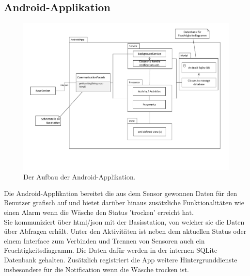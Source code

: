 \subsection{Android-Applikation}
\begin{figure}[htb] 
	\centerline{\includegraphics[scale=.4]{Architektur/App_v2.pdf} }
	\caption{Der Aufbau der Android-Applikation.}
\end{figure}
Die Android-Applikation bereitet die aus dem Sensor gewonnen Daten für den Benutzer grafisch auf und bietet darüber hinaus zusätzliche Funktionalitäten wie einen Alarm wenn die Wäsche den Status 'trocken' erreicht hat.\\
Sie kommuniziert über html/json mit der Basisstation, von welcher sie die Daten über Abfragen erhält. Unter den Aktivitäten ist neben dem aktuellen Status oder einem Interface zum Verbinden und Trennen von Sensoren auch ein Feuchtigkeitsdiagramm. Die Daten dafür werden in der internen SQLite-Datenbank gehalten. Zusätzlich registriert die App weitere Hintergrunddienste insbesondere für die Notification wenn die Wäsche trocken ist.
